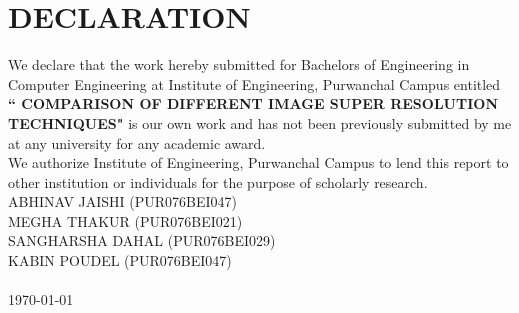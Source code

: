 \newpage
{}
\section*{DECLARATION}
We declare that the work hereby submitted for Bachelors of Engineering in Computer Engineering at Institute of Engineering, Purwanchal Campus entitled \textbf{`` COMPARISON OF DIFFERENT IMAGE SUPER RESOLUTION TECHNIQUES"} is our own work and has not been previously submitted by me at any university for any academic award.\\
We authorize Institute of Engineering, Purwanchal Campus to lend this report to other institution or individuals for the purpose of scholarly research.
\vspace{1cm}\\
ABHINAV JAISHI (PUR076BEI047)\\
MEGHA THAKUR (PUR076BEI021)\\
SANGHARSHA DAHAL (PUR076BEI029)\\
KABIN POUDEL (PUR076BEI047)\\
\\
\today